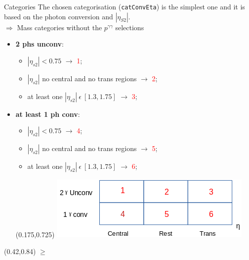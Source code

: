 \documentclass[10pt,UKenglish, leqno, xcolor = dvipsnames]{beamer}
\begin{document}
	\begin{frame}{Categories}
		\vfill
		The chosen categorisation (\texttt{catConvEta}) is the simplest one and it is based on the photon conversion and $|\eta_{S2}|$.\\
		$\Rightarrow$ Mass categories without the $p^{\gamma\gamma}$ selections
		
		\begin{itemize}
			\item \textbf{2 phs unconv}:
			\begin{itemize}
				\item $|\eta_{s2}| < 0.75$ $\rightarrow$ \textcolor{red}{1};
				\item $|\eta_{s2}|$ no central and no trans regions $\rightarrow$ \textcolor{red}{2};
				\item at least one $|\eta_{s2}|\ \epsilon\ [1.3,1.75]$ $\rightarrow$ \textcolor{red}{3};
			\end{itemize}
			\item \textbf{at least 1 ph conv}:
			\begin{itemize}
				\item $|\eta_{s2}| < 0.75$ $\rightarrow$ \textcolor{red}{4};
				\item $|\eta_{s2}|$ no central and no trans regions $\rightarrow$ \textcolor{red}{5};
				\item at least one $|\eta_{s2}|\ \epsilon\ [1.3,1.75]$ $\rightarrow$ \textcolor{red}{6};
			\end{itemize}
		
			\begin{textblock}{1}(0.175,0.725)
				\centering
				\includegraphics[width=.5\textwidth]{Pres_Images/cat_tab.png}
			\end{textblock}
		\end{itemize}
		\begin{textblock}{1}(0.42,0.84)
			\small
			$\geq$
		\end{textblock}
		\vfill
		
	\end{frame}
\end{document}
